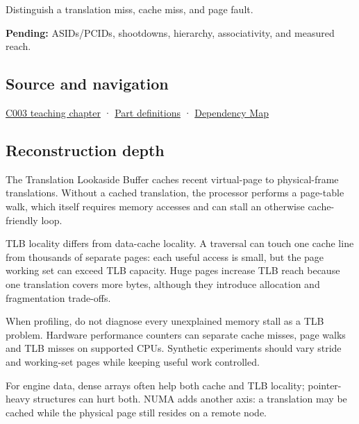 Distinguish a translation miss, cache miss, and page fault.

\textbf{Pending:} ASIDs/PCIDs, shootdowns, hierarchy, associativity, and measured reach.

\subsection{Source and navigation}\label{appendix-7a2d9c5ce511-source-and-navigation}

\hyperref[01-foundations-i-ch002-where-the-bytes-live]{C003 teaching chapter} · \hyperref[appendix-fd090d982a15-m003---parts-41-60]{Part definitions} · \hyperref[appendix-4ad47bdd269a]{Dependency Map}

\subsection{Reconstruction depth}\label{appendix-7a2d9c5ce511-reconstruction-depth}

The Translation Lookaside Buffer caches recent virtual-page to physical-frame translations. Without a cached translation, the processor performs a page-table walk, which itself requires memory accesses and can stall an otherwise cache-friendly loop.

TLB locality differs from data-cache locality. A traversal can touch one cache line from thousands of separate pages: each useful access is small, but the page working set can exceed TLB capacity. Huge pages increase TLB reach because one translation covers more bytes, although they introduce allocation and fragmentation trade-offs.

When profiling, do not diagnose every unexplained memory stall as a TLB problem. Hardware performance counters can separate cache misses, page walks and TLB misses on supported CPUs. Synthetic experiments should vary stride and working-set pages while keeping useful work controlled.

For engine data, dense arrays often help both cache and TLB locality; pointer-heavy structures can hurt both. NUMA adds another axis: a translation may be cached while the physical page still resides on a remote node.
